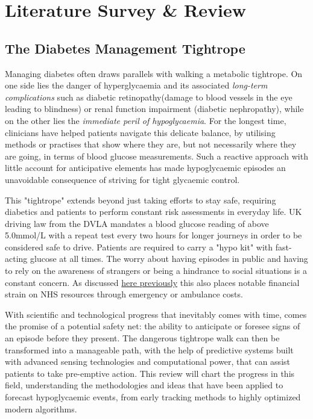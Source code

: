 
\section{Literature Survey \& Review} 

\subsection{The Diabetes Management Tightrope}
\noindent Managing diabetes often draws parallels with walking a metabolic tightrope. On one side lies the danger of hyperglycaemia and its associated \textit{long-term complications} such as diabetic retinopathy(damage to blood vessels in the eye leading to blindness) or renal function impairment (diabetic nephropathy), while on the other lies the \textit{immediate peril of hypoglycaemia}. For the longest time, clinicians have helped patients navigate this delicate balance, by utilising methods or practises that show where they are, but not necessarily where they are going, in terms of blood glucose measurements. Such a reactive approach with little account for anticipative elements has made hypoglycaemic episodes an unavoidable consequence of striving for tight glycaemic control. 

\vspace{5pt}
\noindent This "tightrope" extends beyond just taking efforts to stay safe, requiring diabetics and patients to perform constant risk assessments in everyday life. UK driving law from the DVLA mandates a blood glucose reading of above 5.0mmol/L with a repeat test every two hours for longer journeys in order to be considered safe to drive. Patients are required to carry a "hypo kit" with fast-acting glucose at all times. The worry about having episodes in public and having to rely on the awareness of strangers or being a hindrance to social situations is a constant concern. As discussed \hyperref[sec:clinicalOverview]{here previously} this also places notable financial strain on NHS resources through emergency or ambulance costs.

\vspace{5pt}
\noindent With scientific and technological progress that inevitably comes with time, comes the promise of a potential safety net: the ability to anticipate or foresee signs of an episode before they present. The dangerous tightrope walk can then be transformed into a manageable path, with the help of predictive systems built with advanced sensing technologies and computational power, that can assist patients to take pre-emptive action. This review will chart the progress in this field, understanding the methodologies and ideas that have been applied to forecast hypoglycaemic events, from early tracking methods to highly optimized modern algorithms.




